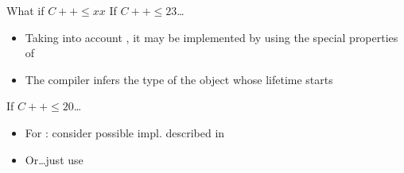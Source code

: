 \begin{frame}{What if $C++ \leq xx$}
  If $C++ \leq 23$\ldots
  \begin{itemize}
    \itemsep=1em
  \item Taking into account , it may be implemented by using the special properties of 

  \item The compiler infers the type of the object whose lifetime starts
  \end{itemize}

  \vfill
  If $C++ \leq 20$\ldots
  \begin{itemize}
    \itemsep=1em
  \item For : consider possible impl. described in 

  \item Or\ldots just use 
  \end{itemize}
\end{frame}
